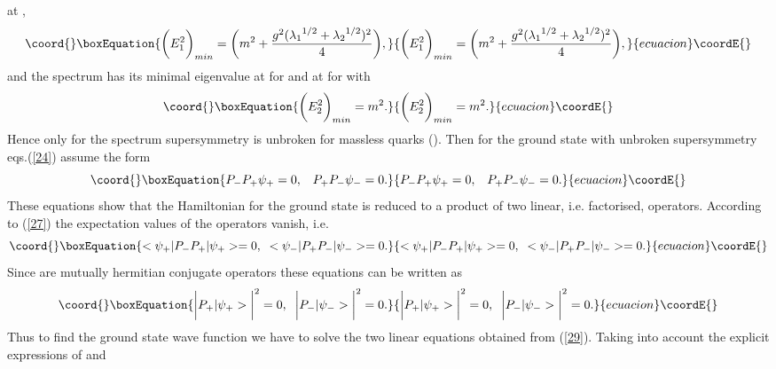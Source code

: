 \documentclass[a4paper,12pt,a4]{article}
\begin{document}
at \coordHE{},
\begin{equation}\coord{}\boxEquation{
\bigg(E^2_1\bigg)_{min}=\bigg( m^2+\frac{g^2({\lambda_1}^{1/2}+{\lambda _2}
^{1/2})^2}{4}\bigg),
\label{25}
}{
\bigg(E^2_1\bigg)_{min}=\bigg( m^2+\frac{g^2({\lambda_1}^{1/2}+{\lambda _2}
^{1/2})^2}{4}\bigg),
}{ecuacion}\coordE{}\end{equation}
and 
 the spectrum \coordHE{} has its minimal eigenvalue at
\coordHE{}
for \coordHE{} 
and at \coordHE{}
for \coordHE{} with
\begin{equation}\coord{}\boxEquation{
 \bigg(E^2_2\bigg)_{min} = m^2.
\label{26}
}{
 \bigg(E^2_2\bigg)_{min} = m^2.
}{ecuacion}\coordE{}\end{equation}
Hence 
only for the spectrum \coordHE{} supersymmetry is
unbroken for massless quarks (\coordHE{}).
Then for the ground state with unbroken supersymmetry
eqs.(\ref{24}) assume the form
\begin{equation}\coord{}\boxEquation{
P_-P_+\psi_+ = 0, \;\;\; P_+P_-\psi_- = 0. 
\label{27}
}{
P_-P_+\psi_+ = 0, \;\;\; P_+P_-\psi_- = 0. 
}{ecuacion}\coordE{}\end{equation}
These equations show that the Hamiltonian for the
ground state is reduced to a product of two
linear, i.e. factorised, operators.
According to (\ref{27}) the expectation values of 
the operators \coordHE{} vanish, i.e.
\begin{equation}\coord{}\boxEquation{
<\psi_+|P_-P_+|\psi_+> = 0, \;\;
<\psi_-|P_+P_-|\psi_-> = 0.
\label{28}
}{
<\psi_+|P_-P_+|\psi_+> = 0, \;\;
<\psi_-|P_+P_-|\psi_-> = 0.
}{ecuacion}\coordE{}\end{equation}
Since \coordHE{} are mutually hermitian  conjugate operators
these equations can be written as 
\begin{equation}\coord{}\boxEquation{
\bigg|P_+|\psi_+>\bigg|^2=0, \;\;
\bigg|P_-|\psi_->\bigg|^2=0.
\label{29}
}{
\bigg|P_+|\psi_+>\bigg|^2=0, \;\;
\bigg|P_-|\psi_->\bigg|^2=0.
}{ecuacion}\coordE{}\end{equation}
Thus to find the ground state wave function we have to solve
the two linear equations obtained from (\ref{29}). Taking
into account the explicit expressions of \coordHE{} and
\end{document}
